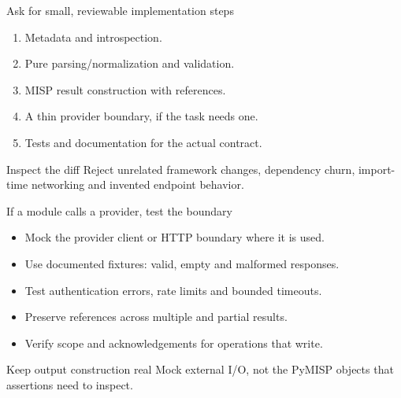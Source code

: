 \begin{frame}{Ask for small, reviewable implementation steps}
    \begin{enumerate}
        \item Metadata and introspection.
        \item Pure parsing/normalization and validation.
        \item MISP result construction with references.
        \item A thin provider boundary, if the task needs one.
        \item Tests and documentation for the actual contract.
    \end{enumerate}
    \begin{block}{Inspect the diff}
        Reject unrelated framework changes, dependency churn,
        import-time networking and invented endpoint behavior.
    \end{block}
\end{frame}

\begin{frame}{If a module calls a provider, test the boundary}
    \begin{itemize}
        \item Mock the provider client or HTTP boundary where it is used.
        \item Use documented fixtures: valid, empty and malformed responses.
        \item Test authentication errors, rate limits and bounded timeouts.
        \item Preserve references across multiple and partial results.
        \item Verify scope and acknowledgements for operations that write.
    \end{itemize}
    \begin{block}{Keep output construction real}
        Mock external I/O, not the PyMISP objects that assertions need to inspect.
    \end{block}
\end{frame}

